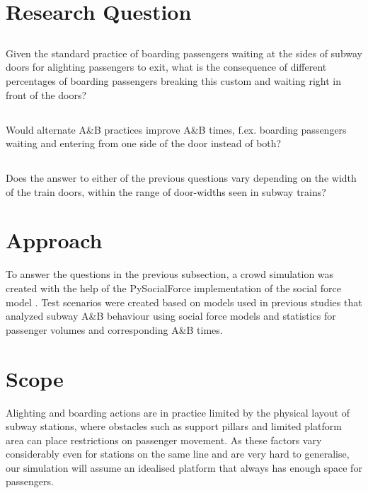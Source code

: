 \documentclass{kththesis}
\begin{document}
\section{Research Question}

\subsection{}
Given the standard practice of boarding passengers waiting at the sides of subway doors for alighting passengers to exit, what is the consequence of different percentages of boarding passengers breaking this custom and waiting right in front of the doors?

\subsection{}
Would alternate A\&B practices improve A\&B times, f.ex. boarding passengers waiting and entering from one side of the door instead of both?

\subsection{}
Does the answer to either of the previous questions vary depending on the width of the train doors, within the range of door-widths seen in subway trains?

\section{Approach}
To answer the questions in the previous subsection, a crowd simulation was created with the help of the PySocialForce implementation of the social force model \parencite{pysocialforce}. Test scenarios were created based on models used in previous studies that analyzed subway A\&B behaviour using social force models and statistics for passenger volumes and corresponding A\&B times.

\section{Scope}
Alighting and boarding actions are in practice limited by the physical layout of subway stations, where obstacles such as support pillars and limited platform area can place restrictions on passenger movement. As these factors vary considerably even for stations on the same line and are very hard to generalise, our simulation will assume an idealised platform that always has enough space for passengers.
\end{document}
